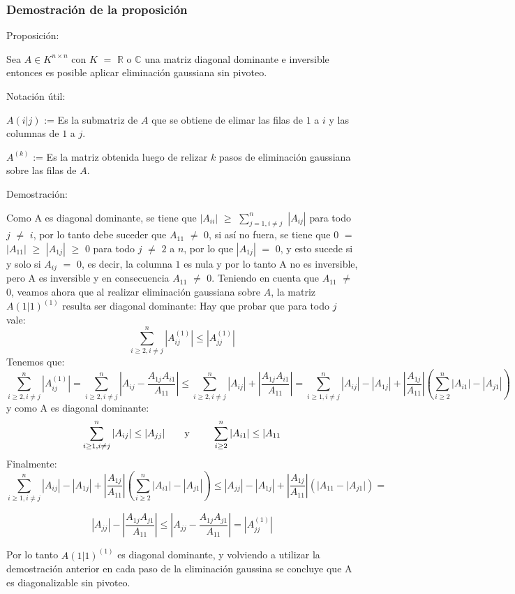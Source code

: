 \subsubsection{Demostración de la proposición}
Proposición:

Sea $A \in K^{n \times n}$ con $K$ $=$ $\mathbb{R}$ o $\mathbb{C}$ una matriz diagonal dominante e inversible entonces es posible aplicar eliminación gaussiana sin pivoteo.

Notación útil: 

$A(i|j)$ := Es la submatriz de $A$ que se obtiene de elimar las filas de $1$ a $i$ y las columnas de $1$ a $j$.

$A^{(k)}$ := Es la matriz obtenida luego de relizar $k$ pasos de eliminación gaussiana sobre las filas de $A$.

Demostración:

Como A es diagonal dominante, se tiene que $|A_{ii}|$ $\geq$ $\sum_{j=1, i \neq j}^{n}$ $|A_{ij}|$ para todo $j$ $\neq$ $i$, por lo tanto debe suceder que $A_{11}$ $\neq$ $0$, si así no fuera, se tiene que $0$ $=$ $|A_{11}|$ $\geq$ $|A_{1j}|$  $\geq$ $0$ para todo $j$ $\neq$ $2$ a $n$, por lo que $|A_{1j}|$ $=$ $0$, y esto sucede si y solo si $A_{ij}$ $=$ $0$, es decir, la columna $1$ es nula y por lo tanto A no es inversible, pero A es inversible y en consecuencia $A_{11}$ $\neq$ $0$.
Teniendo en cuenta que $A_{11}$ $\neq$ $0$, veamos ahora que al realizar eliminación gaussiana sobre $A$, la matriz $A(1|1)^{(1)}$ resulta ser diagonal dominante:
Hay que probar que para todo $j$ vale:
\[
\sum_{i \geq 2, i \neq j}^{n}|A_{ij}^{(1)}| \leq  |A_{jj}^{(1)}| 
\]
Tenemos que:
\[
\sum_{i \geq 2, i \neq j}^{n} |A_{ij}^{(1)}| =  \sum_{i \geq 2, i \neq j}^{n} |A_{ij} - \frac{A_{1j}A_{i1}}{A_{11}}| \leq 
\sum_{i \geq 2, i \neq j}^{n} |A_{ij}| + |\frac{A_{1j}A_{i1}}{A_{11}}| =
\sum_{i \geq 1, i \neq j}^{n} |A_{ij}| - |A_{1j}| + |\frac{A_{1j}}{A_{11}}|(\sum_{i \geq 2}^{n} |A_{i1}| - |A_{j1}|)
\]
y como A es diagonal dominante:
\[
\sum_{i \geq 1, i \neq j}^{n} |A_{ij}| \leq |A_{jj}| \text{\qquad y \qquad} \sum_{i \geq 2}^{n} |A_{i1}| \leq |A_{11}
\]
Finalmente:
\[
\sum_{i \geq 1, i \neq j}^{n} |A_{ij}| - |A_{1j}| + |\frac{A_{1j}}{A_{11}}|(\sum_{i \geq 2}^{n} |A_{i1}| - |A_{j1}|) \leq
|A_{jj}| - |A_{1j}| + |\frac{A_{1j}}{A_{11}}|(|A_{11} - |A_{j1}|) =
\]

\[
|A_{jj}| - |\frac{A_{1j}A_{j1}}{A_{11}}| \leq
|A_{jj} - \frac{A_{1j}A_{j1}}{A_{11}}| = |A_{jj}^{(1)}|
\]

Por lo tanto $A(1|1)^{(1)}$ es diagonal dominante, y volviendo a utilizar la demostración anterior en cada paso de la eliminación gaussina se concluye que A es diagonalizable sin pivoteo.

